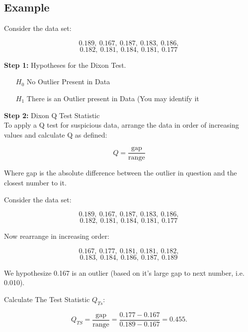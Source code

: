 \documentclass[a4paper,12pt]{article}
\begin{document}
	
	
\newpage
	
	
	

\subsection*{Example}
Consider the data set:
\begin{framed}
	\[0.189,\ 0.167,\ 0.187,\ 0.183,\ 0.186,\]\[ 0.182,\ 0.181,\ 0.184,\ 0.181,\ 0.177 \,\]
\end{framed}



\noindent \textbf{Step 1:} Hypotheses for the Dixon Test.

\begin{framed}
\begin{itemize}
	\item[$H_0$] No Outlier Present in Data
	\item[$H_1$] There is an Outlier present in Data (You may identify it
\end{itemize}
\end{framed}



\noindent \textbf{Step 2:} Dixon Q Test Statistic\\ \smallskip
To apply a Q test for suspicious data, arrange the data in order of increasing values and calculate Q as defined:
\begin{framed}
	\[ Q = \frac{\text{gap}}{\text{range}} \]
\end{framed}
\noindent Where gap is the absolute difference between the outlier in question and the closest number to it. 


\noindent Consider the data set:
\begin{framed}
	\[0.189,\ 0.167,\ 0.187,\ 0.183,\ 0.186,\]\[ 0.182,\ 0.181,\ 0.184,\ 0.181,\ 0.177 \,\]
\end{framed}
\noindent Now rearrange in increasing order:
\begin{framed}
	\[0.167,\ 0.177,\ 0.181,\ 0.181,\ 0.182,\]\[ 0.183,\ 0.184,\ 0.186,\ 0.187,\ 0.189 \, \]
\end{framed}


\noindent We hypothesize 0.167 is an outlier (based on it's large gap to next number, i.e. 0.010). 
\begin{framed}
\noindent Calculate The Test Statistic $Q_{Ts}$:
{

	\[ Q_{TS}=\frac{\text{gap}}{\text{range}} = \frac{0.177-0.167}{0.189-0.167}=0.455.\]
}
\end{framed}
\end{document}
